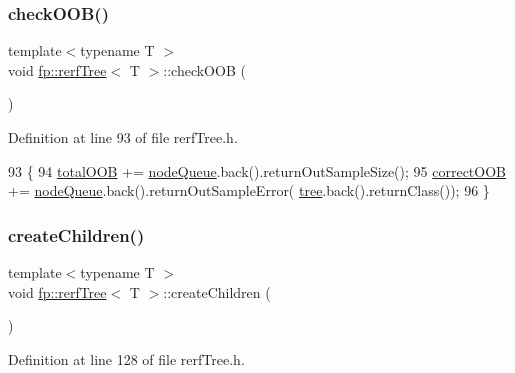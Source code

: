 \subsubsection{\texorpdfstring{check\+O\+O\+B()}{checkOOB()}}
{\footnotesize\ttfamily template$<$typename T $>$ \\
void \hyperlink{classfp_1_1rerfTree}{fp\+::rerf\+Tree}$<$ T $>$\+::check\+O\+OB (\begin{DoxyParamCaption}{ }\end{DoxyParamCaption})\hspace{0.3cm}{\ttfamily [inline]}}



Definition at line 93 of file rerf\+Tree.\+h.


\begin{DoxyCode}
93                                       \{
94                     \hyperlink{classfp_1_1rerfTree_aaac789925d8100bf33cdbb440df8e593}{totalOOB} += \hyperlink{classfp_1_1rerfTree_a59b3bdcba86acbe93fd46658132218a8}{nodeQueue}.back().returnOutSampleSize();
95                     \hyperlink{classfp_1_1rerfTree_a07330eb1a89870eb8d3c07d0c1af0ec9}{correctOOB} += \hyperlink{classfp_1_1rerfTree_a59b3bdcba86acbe93fd46658132218a8}{nodeQueue}.back().returnOutSampleError(
      \hyperlink{classfp_1_1rerfTree_afc9392154cb4d1dde02e26a9ec31e356}{tree}.back().returnClass());
96                 \}
\end{DoxyCode}
\mbox{\label{classfp_1_1rerfTree_a75ebcd9e258fdb49094e008e121bfe0a}} 
\subsubsection{\texorpdfstring{create\+Children()}{createChildren()}}
{\footnotesize\ttfamily template$<$typename T $>$ \\
void \hyperlink{classfp_1_1rerfTree}{fp\+::rerf\+Tree}$<$ T $>$\+::create\+Children (\begin{DoxyParamCaption}{ }\end{DoxyParamCaption})\hspace{0.3cm}{\ttfamily [inline]}}



Definition at line 128 of file rerf\+Tree.\+h.


